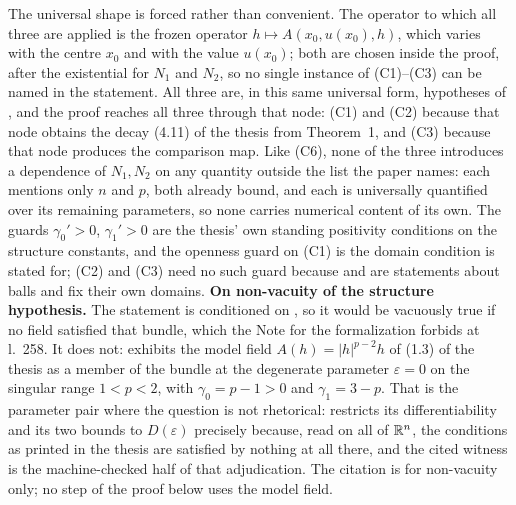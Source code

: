 \begin{theorem}[Theorem 5]
The universal shape is forced rather than convenient.  The operator to which all
three are applied is the frozen operator $h\mapsto A(x_0,u(x_0),h)$, which
varies with the centre $x_0$ and with the value $u(x_0)$; both are chosen inside
the proof, after the existential for $N_1$ and $N_2$, so no single instance of
(C1)--(C3) can be named in the statement.  All three are, in this same
universal form, hypotheses of , and the proof
reaches all three through that node: (C1) and (C2) because that node obtains the
decay (4.11) of the thesis from Theorem~1, and (C3) because that node produces the
comparison map.  Like (C6), none of the three introduces a
dependence of $N_1,N_2$ on any quantity outside the list the paper names: each
mentions only $n$ and $p$, both already bound, and each is universally
quantified over its remaining parameters, so none carries numerical content of
its own.  The guards $\gamma_0'>0$, $\gamma_1'>0$ are the thesis' own standing
positivity conditions on the structure constants, and the openness guard on (C1)
is the domain condition  is stated for; (C2) and
(C3) need no such guard because  and
 are statements about balls and fix their own
domains.
\textbf{On non-vacuity of the structure hypothesis.}  The statement is
conditioned on , so it would be vacuously true if
no field satisfied that bundle, which the Note for the formalization forbids at
l.~258.  It does not:  exhibits the model field
$A(h)=|h|^{p-2}h$ of (1.3) of the thesis as a member of the bundle at the degenerate
parameter $\varepsilon=0$ on the singular range $1<p<2$, with $\gamma_0=p-1>0$
and $\gamma_1=3-p$.  That is the parameter pair where the question is not
rhetorical:  restricts its differentiability and
its two bounds to $D(\varepsilon)$ precisely because, read on all of $\mathbb{R}^n$, the
conditions as printed in the thesis are satisfied by nothing at all there, and
the cited witness is the machine-checked half of that adjudication.  The citation
is for non-vacuity only; no step of the proof below uses the model field.
\end{theorem}

